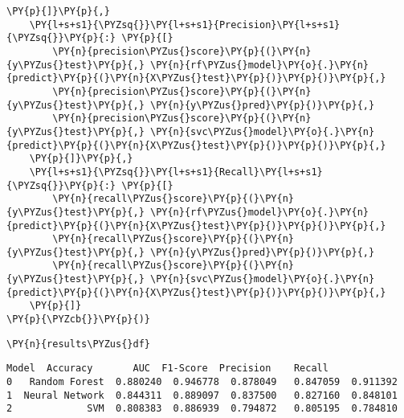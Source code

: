 \begin{tcolorbox}[breakable, size=fbox, boxrule=1pt, pad at break*=1mm,colback=cellbackground, colframe=cellborder]
\begin{Verbatim}[commandchars=\\\{\}]
    \PY{p}{]}\PY{p}{,}
    \PY{l+s+s1}{\PYZsq{}}\PY{l+s+s1}{Precision}\PY{l+s+s1}{\PYZsq{}}\PY{p}{:} \PY{p}{[}
        \PY{n}{precision\PYZus{}score}\PY{p}{(}\PY{n}{y\PYZus{}test}\PY{p}{,} \PY{n}{rf\PYZus{}model}\PY{o}{.}\PY{n}{predict}\PY{p}{(}\PY{n}{X\PYZus{}test}\PY{p}{)}\PY{p}{)}\PY{p}{,}
        \PY{n}{precision\PYZus{}score}\PY{p}{(}\PY{n}{y\PYZus{}test}\PY{p}{,} \PY{n}{y\PYZus{}pred}\PY{p}{)}\PY{p}{,}
        \PY{n}{precision\PYZus{}score}\PY{p}{(}\PY{n}{y\PYZus{}test}\PY{p}{,} \PY{n}{svc\PYZus{}model}\PY{o}{.}\PY{n}{predict}\PY{p}{(}\PY{n}{X\PYZus{}test}\PY{p}{)}\PY{p}{)}\PY{p}{,}
    \PY{p}{]}\PY{p}{,}
    \PY{l+s+s1}{\PYZsq{}}\PY{l+s+s1}{Recall}\PY{l+s+s1}{\PYZsq{}}\PY{p}{:} \PY{p}{[}
        \PY{n}{recall\PYZus{}score}\PY{p}{(}\PY{n}{y\PYZus{}test}\PY{p}{,} \PY{n}{rf\PYZus{}model}\PY{o}{.}\PY{n}{predict}\PY{p}{(}\PY{n}{X\PYZus{}test}\PY{p}{)}\PY{p}{)}\PY{p}{,}
        \PY{n}{recall\PYZus{}score}\PY{p}{(}\PY{n}{y\PYZus{}test}\PY{p}{,} \PY{n}{y\PYZus{}pred}\PY{p}{)}\PY{p}{,}
        \PY{n}{recall\PYZus{}score}\PY{p}{(}\PY{n}{y\PYZus{}test}\PY{p}{,} \PY{n}{svc\PYZus{}model}\PY{o}{.}\PY{n}{predict}\PY{p}{(}\PY{n}{X\PYZus{}test}\PY{p}{)}\PY{p}{)}\PY{p}{,}
    \PY{p}{]}
\PY{p}{\PYZcb{}}\PY{p}{)}
\end{Verbatim}
\end{tcolorbox}

    \begin{tcolorbox}[breakable, size=fbox, boxrule=1pt, pad at break*=1mm,colback=cellbackground, colframe=cellborder]
\begin{Verbatim}[commandchars=\\\{\}]
\PY{n}{results\PYZus{}df}
\end{Verbatim}
\end{tcolorbox}

            \begin{tcolorbox}[breakable, size=fbox, boxrule=.5pt, pad at break*=1mm, opacityfill=0]
\begin{Verbatim}[commandchars=\\\{\}]
            Model  Accuracy       AUC  F1-Score  Precision    Recall
0   Random Forest  0.880240  0.946778  0.878049   0.847059  0.911392
1  Neural Network  0.844311  0.889097  0.837500   0.827160  0.848101
2             SVM  0.808383  0.886939  0.794872   0.805195  0.784810
\end{Verbatim}
\end{tcolorbox}
        

    
    
    

